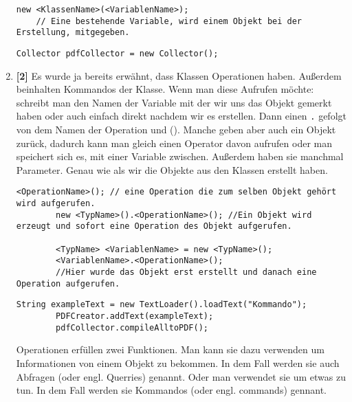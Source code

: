 \begin{enumerate}
\begin{lstlisting}[title=\textbf{Variablen Syntax}]
    new <KlassenName>(<VariablenName>); 
    // Eine bestehende Variable, wird einem Objekt bei der Erstellung, mitgegeben.
          \end{lstlisting}
          \begin{lstlisting}[title=\textbf{Beispiel (2/3) Variablen},firstnumber=1,frame=ltr]
            Collector pdfCollector = new Collector();
        \end{lstlisting}
    \item \textbf{[2]} Es wurde ja bereits erwähnt, dass Klassen Operationen haben. Außerdem beinhalten  Kommandos der Klasse. Wenn man diese Aufrufen möchte: schreibt man den Namen der Variable mit der wir uns das Objekt gemerkt haben oder auch einfach direkt nachdem wir es erstellen. Dann einen \lstinline{.} gefolgt von dem Namen der Operation und (). Manche geben aber auch ein Objekt zurück, dadurch kann man gleich einen Operator davon aufrufen oder man speichert sich es, mit einer Variable zwischen. Außerdem haben sie manchmal Parameter. Genau wie als wir die Objekte aus den Klassen erstellt haben.
          \begin{lstlisting}[title=\textbf{Kommando Syntax},firstnumber=4]
        <OperationName>(); // eine Operation die zum selben Objekt gehört wird aufgerufen.
        new <TypName>().<OperationName>(); //Ein Objekt wird erzeugt und sofort eine Operation des Objekt aufgerufen.

        <TypName> <VariablenName> = new <TypName>();
        <VariablenName>.<OperationName>();
        //Hier wurde das Objekt erst erstellt und danach eine Operation aufgerufen.
            \end{lstlisting}
          \begin{lstlisting}[title=\textbf{Beispiel 3/3 Kommandos},firstnumber=3,frame=lbr]
        String exampleText = new TextLoader().loadText("Kommando");
        PDFCreator.addText(exampleText);
        pdfCollector.compileAlltoPDF();
              \end{lstlisting}
          \begin{Infobox}[Operationen]
              Operationen erfüllen zwei Funktionen. Man kann sie dazu verwenden um Informationen von einem Objekt zu bekommen.
              In dem Fall werden sie auch Abfragen (oder engl. Querries) genannt.
              Oder man verwendet sie um etwas zu tun. In dem Fall werden sie Kommandos (oder engl. commands) gennant.
          \end{Infobox}


\end{enumerate}
